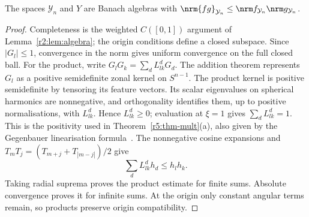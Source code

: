 \begin{lemma}\label{gd:lem:algebra}
The spaces $\mathcal Y_n$ and $Y$ are Banach algebras with
$\nrm{fg}_{\mathcal Y_n}\le\nrm f_{\mathcal Y_n}\nrm g_{\mathcal Y_n}$.
\end{lemma}
\begin{proof}
Completeness is the weighted $C([0,1])$ argument of
Lemma~\ref{r2:lem:algebra}; the origin conditions define a closed subspace.
Since $|G_l|\le1$, convergence in the norm gives uniform convergence on
the full closed ball. For the product, write
$G_lG_k=\sum_dL_{lk}^dG_d$. The addition theorem represents $G_l$
as a positive semidefinite zonal kernel on $S^{n-1}$.
The product kernel is positive semidefinite by tensoring its feature
vectors. Its scalar eigenvalues on spherical harmonics are nonnegative,
and orthogonality identifies them, up to positive normalisations, with
$L_{lk}^d$. Hence $L_{lk}^d\ge0$; evaluation at $\xi=1$ gives
$\sum_dL_{lk}^d=1$. This is the positivity used in
Theorem~\ref{r5:thm-mult}(a), also given by the Gegenbauer linearisation
formula~\cite[18.18.22]{DLMF}.
The nonnegative cosine expansions and
$T_mT_j=(T_{m+j}+T_{|m-j|})/2$ give
\[
 \sum_dL_{lk}^dh_d\le h_lh_k .
\]
Taking radial suprema proves the product estimate for finite sums.
Absolute convergence proves it for infinite sums. At the origin only
constant angular terms remain, so products preserve origin compatibility.
\end{proof}

